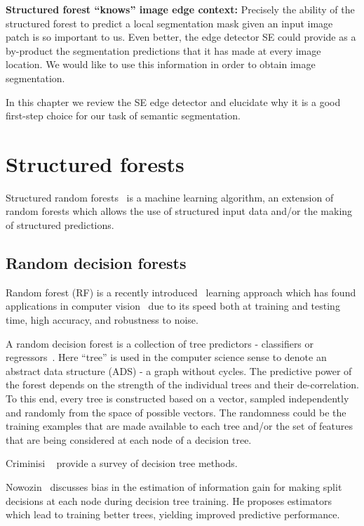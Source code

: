 \textbf{Structured forest ``knows'' image edge context:} Precisely the ability of the structured forest to predict a local segmentation mask given an input image patch is so important to us. Even better, the edge detector SE could provide as a by-product the segmentation predictions that it has made at every image location. We would like to use this information in order to obtain image segmentation.

In this chapter we review the SE edge detector and elucidate why it is a good first-step choice for our task of semantic segmentation.

\section{Structured forests}
Structured random forests~\cite{KontschiederBBP11,DollarICCV13edges} is a machine learning algorithm, an extension of random forests which allows the use of structured input data and\slash or the making of structured predictions.

\subsection{Random decision forests}
Random forest (RF) is a recently introduced~\cite{Breiman01} learning approach which has found applications in computer vision~\cite{KontschiederBBP11,LimZD13,DollarICCV13edges,Dollar2015PAMI} due to its speed both at training and testing time, high accuracy, and robustness to noise.

A random decision forest is a collection %
of tree predictors - classifiers or regressors~\cite{breiman1984classification}. Here ``tree'' is used in the computer science sense to denote an abstract data structure (ADS) - a graph without cycles. 
The predictive power of the forest depends on the strength of the individual trees and their de-correlation. To this end, %
every tree is constructed based on a vector, sampled independently and randomly from the space of possible vectors. The randomness could be \wrt the training examples that are made available to each tree and\slash or the set of features that are being considered at each node of a decision tree.

Criminisi \etal~\cite{Criminisi12} provide a survey of decision tree methods.

Nowozin~\cite{Nowozin12improvedinformation,nowozin2014decision} discusses bias in the estimation of information gain for making split decisions at each node during decision tree training. He proposes estimators which lead to training better trees, yielding improved predictive performance.

